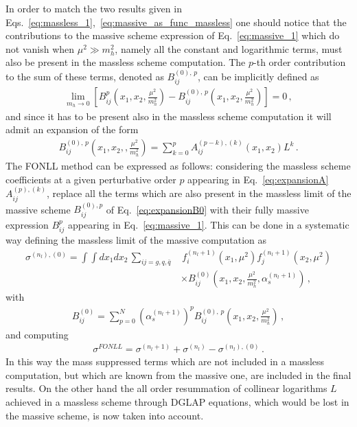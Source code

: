 In order to match the two results given in Eqs.~\eqref{eq:massless_1},~\eqref{eq:massive_as_func_massless} 
one should notice that the contributions to the massive scheme expression of Eq.~\eqref{eq:massive_1}
which do not vanish when $\mu^2 \gg m_h^2$, namely all the constant and logarithmic terms, 
must also be present in the massless scheme computation.
The $p$-th order contribution to the sum of these terms, denoted as $B_{ij}^{(0),\,p}$, can be implicitly defined as
\begin{align}
    \lim_{m_h\rightarrow 0}\left[B_{ij}^p\left(x_1,x_2,\frac{\mu^2}{m_h^2}\right)- 
    B_{ij}^{(0),\,p}\left(x_1,x_2,\frac{\mu^2}{m_h^2}\right)\right] = 0\,,
\end{align}
and since it has to be present also in the massless scheme computation it will admit an expansion of the form
\begin{align}
    \label{eq:expansionB0}
    B_{ij}^{(0),\,p}\left(x_1,x_2,,\frac{\mu^2}{m_h^2}\right) = \sum_{k=0}^p  A_{ij}^{(p-k),(k)}\left(x_1,x_2\right)L^k\,.
\end{align}
The FONLL method can be expressed as follows: considering the massless scheme coefficients
at a given perturbative order $p$  
appearing in Eq.~\eqref{eq:expansionA} $A^{(p),(k)}_{ij}$, replace all the terms which are also present in the massless limit of the massive scheme
$B^{(0),p}_{ij}$ of Eq.~\eqref{eq:expansionB0} with their fully massive expression $B^{p}_{ij}$ appearing in Eq.~\eqref{eq:massive_1}.
This can be done in a systematic way defining the massless limit of the massive computation as
\begin{align}
    \label{eq:massive_massless_limit}
    \sigma^{(n_l),(0)} = \int \int dx_1 dx_2\, \sum_{ij = g,q,\bar{q} }&\, 
    f_i^{(n_l+1)}\left(x_1,\mu^2\right)f_j^{(n_l+1)}\left(x_2,\mu^2\right) \nonumber \\
    &\times B^{(0)}_{ij}\left(x_1,x_2,\frac{\mu^2}{m_h^2},\alpha_s^{(n_l+1)}\right)\,,
\end{align}
with
\begin{align}
    B^{(0)}_{ij} = \sum_{p=0}^N \left(\alpha_s^{(n_l+1)}\right)^p  B_{ij}^{(0),\,p}\left(x_1,x_2,\frac{\mu^2}{m_h^2}\right)\,,
\end{align}
and computing 
\begin{align}
    \sigma^{FONLL} = \sigma^{(n_l+1)} + \sigma^{(n_l)} - \sigma^{(n_l),(0)}\,.
\end{align}
In this way the mass suppressed terms which are not included in a massless computation, but which
are known from the massive one, are included in the final results.
On the other hand the all order resummation of collinear logarithms $L$ achieved 
in a massless scheme through DGLAP equations, which would be lost in the massive scheme, is now taken into account.